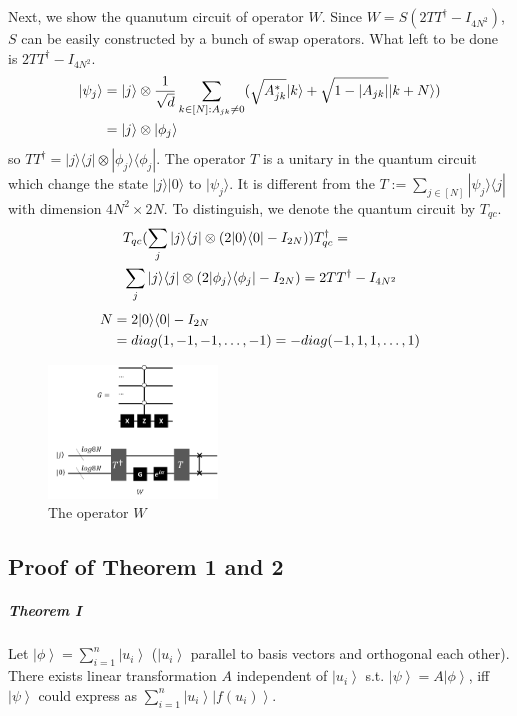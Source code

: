\documentclass[%
 reprint,
 amsmath,amssymb,
pra,
]{revtex4-1}
\begin{document}
Next, we show the quanutum circuit of operator $W$. Since $W=S(2TT^\dagger-I_{4N^2})$, $S$ can be easily constructed by a bunch of swap operators.
What left to be done is $2TT^\dagger-I_{4N^2}$. 
\begin{align}
|\psi_j\rangle&=|j\rangle\otimes\frac{1}{\sqrt{d}} 
\sum_{k\in [N]:A_{jk}\neq 0}(\sqrt{A^*_{jk}}|k\rangle+\sqrt{1-|A_{jk}|}|k+N
\rangle)\notag\\
&=|j\rangle\otimes|\phi_j\rangle\notag
\end{align}
so $TT^\dagger=|j\rangle\langle j|\otimes|\phi_j\rangle\langle\phi_j|$.
The operator $T$ is a unitary in the quantum circuit which change
the state $|j\rangle|0\rangle$ to $|\psi_j\rangle$. It is different from the
$T:=\sum_{j\in[N]}|\psi_j\rangle\langle j|$ with dimension $4N^2\times2N$.
To distinguish, we denote the quantum circuit by $T_{qc}$.
\begin{align}
&T_{qc}(\sum_j|j\rangle\langle j|\otimes(2|0\rangle\langle0|-I_{2N}))
T_{qc}^\dagger=\notag\\
&\sum_j|j\rangle\langle j|\otimes
(2|\phi_j\rangle\langle \phi_j|-I_{2N})=2TT^\dagger-I_{4N^2}\notag
\end{align}
\begin{align}
N&=2|0\rangle\langle0|-I_{2N}\notag \\
&=diag(1,-1,-1,\dots,-1)=-diag(-1,1,1,\dots,1)\notag
\end{align}
\begin{figure}[htbp]
\centering
\includegraphics[width=0.4\textwidth]{Fig/WW}
\caption{The operator $W$}
\label{W}
\end{figure}

\subsection{Proof of Theorem 1 and 2}\label{ProofOfTheorem}
\subparagraph{Theorem I} Let $\left|\phi\right\rangle = \sum_{i=1}^n \left|u_i\right\rangle$ ($\left|u_i\right\rangle$ parallel to basis vectors and orthogonal each other). There exists 
linear transformation $A$ independent of $\left|u_{i}\right\rangle$ s.t. $\left|\psi\right\rangle = A\left|\phi\right\rangle$, iff $\left|\psi\right\rangle$ could express as $\sum_{i=1}^{n}\left|u_i\right\rangle\left|f\left(u_i\right)\right\rangle$.
\end{document}
